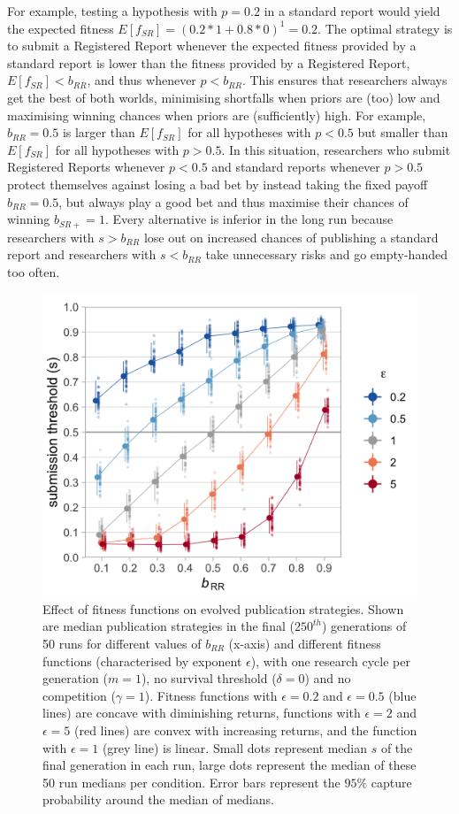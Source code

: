 \documentclass[
  ,man,mask,floatsintext]{apa6}
\begin{document}
For example, testing a hypothesis with \(p = 0.2\) in a standard report would yield the expected fitness \(E[f_{SR}] = (0.2 * 1 + 0.8 * 0)^1 = 0.2\).
The optimal strategy is to submit a Registered Report whenever the expected fitness provided by a standard report is lower than the fitness provided by a Registered Report, \(E[f_{SR}] < b_{RR}\), and thus whenever \(p < b_{RR}\).
This ensures that researchers always get the best of both worlds, minimising shortfalls when priors are (too) low and maximising winning chances when priors are (sufficiently) high.
For example, \(b_{RR} = 0.5\) is larger than \(E[f_{SR}]\) for all hypotheses with \(p < 0.5\) but smaller than \(E[f_{SR}]\) for all hypotheses with \(p > 0.5\).
In this situation, researchers who submit Registered Reports whenever \(p<0.5\) and standard reports whenever \(p>0.5\) protect themselves against losing a bad bet by instead taking the fixed payoff \(b_{RR} = 0.5\), but always play a good bet and thus maximise their chances of winning \(b_{SR+} = 1\).
Every alternative is inferior in the long run because researchers with \(s > b_{RR}\) lose out on increased chances of publishing a standard report and researchers with \(s < b_{RR}\) take unnecessary risks and go empty-handed too often.



\begin{figure}

{\centering \includegraphics[width=0.65\linewidth]{plots/plot_b_epsilon} 

}

\caption{Effect of fitness functions on evolved publication strategies. Shown are median publication strategies in the final (\(250^{th}\)) generations of 50 runs for different values of \(b_{RR}\) (x-axis) and different fitness functions (characterised by exponent \(\epsilon\)), with one research cycle per generation (\(m = 1\)), no survival threshold (\(\delta = 0\)) and no competition (\(\gamma = 1\)). Fitness functions with \(\epsilon = 0.2\) and \(\epsilon = 0.5\) (blue lines) are concave with diminishing returns, functions with \(\epsilon = 2\) and \(\epsilon = 5\) (red lines) are convex with increasing returns, and the function with \(\epsilon = 1\) (grey line) is linear. Small dots represent median \(s\) of the final generation in each run, large dots represent the median of these 50 run medians per condition. Error bars represent the \(95\%\) capture probability around the median of medians.}\label{fig:epsilonplot}
\end{figure}
\end{document}

